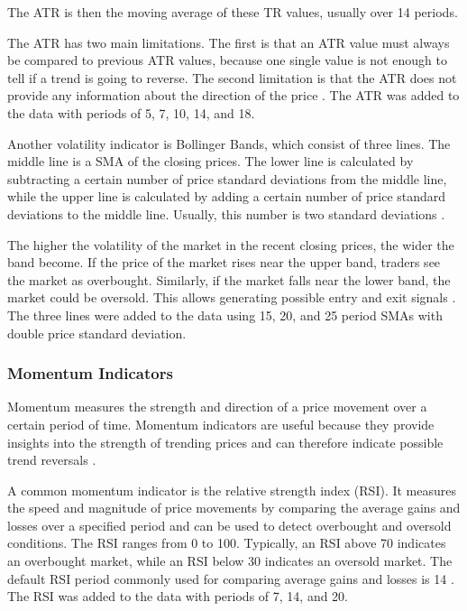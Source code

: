 \noindent
The ATR is then the moving average of these TR values, usually over 14 periods.

The ATR has two main limitations.
The first is that an ATR value must always be compared to previous ATR values, because one single value is not enough to tell if a trend is going to reverse.
The second limitation is that the ATR does not provide any information about the direction of the price \cite{investopia-atr}.
The ATR was added to the data with periods of 5, 7, 10, 14, and 18.

Another volatility indicator is Bollinger Bands, which consist of three lines.
The middle line is a SMA of the closing prices.
The lower line is calculated by subtracting a certain number of price standard deviations from the middle line, while the upper line is calculated by adding a certain number of price standard deviations to the middle line.
Usually, this number is two standard deviations \cite{investopia-bb}.

The higher the volatility of the market in the recent closing prices, the wider the band become.
If the price of the market rises near the upper band, traders see the market as overbought.
Similarly, if the market falls near the lower band, the market could be oversold.
This allows generating possible entry and exit signals \cite{investopia-bb}.
The three lines were added to the data using 15, 20, and 25 period SMAs with double price standard deviation.

\subsubsection{Momentum Indicators}

Momentum measures the strength and direction of a price movement over a certain period of time.
Momentum indicators are useful because they provide insights into the strength of trending prices and can therefore indicate possible trend reversals \cite{investopia-momentum}.

A common momentum indicator is the relative strength index (RSI).
It measures the speed and magnitude of price movements by comparing the average gains and losses over a specified period and can be used to detect overbought and oversold conditions.
The RSI ranges from 0 to 100.
Typically, an RSI above 70 indicates an overbought market, while an RSI below 30 indicates an oversold market.
The default RSI period commonly used for comparing average gains and losses is 14 \cite{investopia-rsi}.
The RSI was added to the data with periods of 7, 14, and 20.


